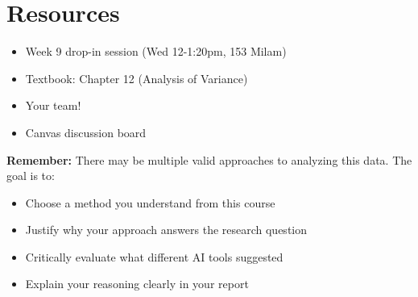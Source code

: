 \documentclass[11pt]{article}
\begin{document}
\section*{Resources}

\begin{itemize}
\item Week 9 drop-in session (Wed 12-1:20pm, 153 Milam)
\item Textbook: Chapter 12 (Analysis of Variance)
\item Your team!
\item Canvas discussion board
\end{itemize}

\vspace{1cm}

\begin{tcolorbox}[colback=gray!10,colframe=gray!50,boxrule=1pt,arc=2pt]
\textbf{Remember:} There may be multiple valid approaches to analyzing this data. The goal is to:
\begin{itemize}
\item Choose a method you understand from this course
\item Justify why your approach answers the research question
\item Critically evaluate what different AI tools suggested
\item Explain your reasoning clearly in your report
\end{itemize}
\end{tcolorbox}
\end{document}
